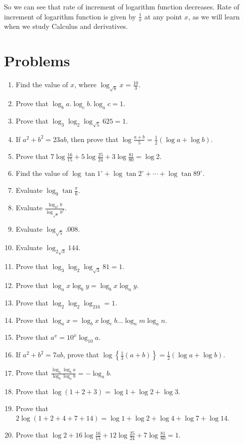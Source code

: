 So we can see that rate of increment of logarithm function decreases. Rate of increment of logarithm function is given by
$\frac{1}{x}$ at any point $x$, as we will learn when we study Calculus and derivatives.

\section{Problems}
\begin{enumerate}
\item Find the value of $x$, where $\log_{\sqrt{8}} x = \frac{10}{3}$.
\item Prove that $\log_ba.\log_cb.\log_ac = 1$.
\item Prove that $\log_3\log_2\log_{\sqrt{5}}625 = 1$.
\item If $a^2 + b^2 = 23ab$, then prove that $\log\tfrac{a + b}{5} = \frac{1}{2}(\log a + \log b)$.
\item Prove that $7\log\frac{16}{15} + 5\log\frac{25}{24} + 3\log\frac{81}{80} = \log 2$.
\item Find the value of $\log\tan1^\circ + \log\tan2^\circ + \cdots + \log\tan89^\circ$.
\item Evaluate $\log_9\tan\frac{\pi}{6}$.
\item Evaluate $\frac{\log_{a^2}b}{\log_{\sqrt{a}}b^2}$.
\item Evaluate $\log_{\sqrt{5}}.008$.
\item Evaluate $\log_{2\sqrt{3}}144$.
\item Prove that $\log_3\log_2\log_{\sqrt{3}}81 = 1$.
\item Prove that $\log_ax\log_by = \log_bx\log_ay$.
\item Prove that $\log_2\log_2\log_216 = 1$.
\item Prove that $\log_ax = \log_bx\log_cb\ldots\log_nm\log_an$.
\item Prove that $a^x = 10^x\log_{10}a$.
\item If $a^2 + b^2 = 7ab$, prove that $\log\left\{\tfrac{1}{3}(a + b)\right\} = \frac{1}{2}(\log a + \log b)$.
\item Prove that $\frac{\log_a\log_ba}{\log_b\log_ab} = -\log_ab$.
\item Prove that $\log(1 + 2 + 3) = \log 1 + \log 2 + \log 3$.
\item Prove that $2\log(1 + 2 + 4 + 7 + 14) = \log 1 + \log 2 + \log 4 + \log 7 + \log 14$.
\item Prove that $\log 2 + 16\log\frac{16}{15} + 12\log\frac{25}{24} + 7\log\frac{81}{80} = 1$.

\end{enumerate}
